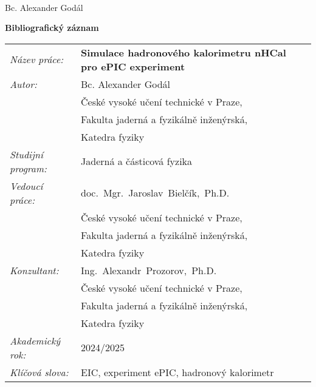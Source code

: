 \documentclass[a4paper, 12pt, oneside]{book}
\newcommand{\cvut}{České vysoké učení technické v Praze}
\newcommand{\fjfi}{Fakulta jaderná a fyzikálně inženýrská}
\newcommand{\kf}{Katedra fyziky}
\newcommand{\obor}{Jaderná a částicová fyzika}
\newcommand{\nazevcz}{Simulace hadronového kalorimetru nHCal pro ePIC experiment}
\newcommand{\klicovaslovacz}{EIC, experiment ePIC, hadronový kalorimetr}
\newcommand{\autor}{Bc. Alexander Godál}
\newcommand{\vedouci}{doc.~Mgr.~Jaroslav~Bielčík,~Ph.D.}
\newcommand{\konzultant}{Ing.~Alexandr~Prozorov,~Ph.D.}
\newcommand{\akrok}{2024/2025}
\begin{document}




%
%

%


\newpage
\thispagestyle{empty}


\vfill 
{}
\bigskip
\\
\indent %
\begin{flushright}
\autor
\end{flushright} 


\newpage
\thispagestyle{empty}

{\bf Bibliografický záznam}

\vspace{5mm} 

\begin{tabular}{p{100pt}l}
  {\em Název práce:} & {\bf \footnotesize\nazevcz} \\
  {\em Autor:} & \autor \\
   &\cvut, \\   
   &\fjfi,\\
   &\kf\\ 
  {\em Studijní program:} & \obor\\ 
  {\em Vedoucí práce:} & \vedouci \\ 
   &\cvut, \\   
   &\fjfi,\\
   &\kf\\
  {\em Konzultant:} & \konzultant \\ 
   &\cvut, \\   
   &\fjfi,\\
   &\kf\\
  {\em Akademický rok:} & \akrok\\
  {\em Klíčová slova:} & \klicovaslovacz\\
\end{tabular}
\end{document}
